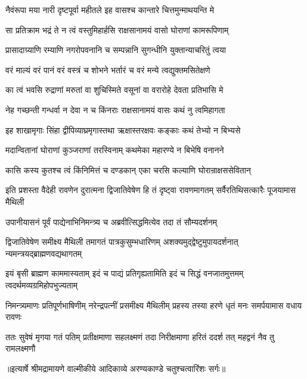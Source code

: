 \twolineshloka
{नैवंरूपा मया नारी दृष्टपूर्वा महीतले}
{इह वासश्च कान्तारे चित्तमुन्माथयन्ति मे} %

\twolineshloka
{सा प्रतिक्राम भद्रं ते न त्वं वस्तुमिहार्हसि}
{राक्षसानामयं वासो घोराणां कामरूपिणाम्} %

\twolineshloka
{प्रासादाग्र्याणि रम्याणि नगरोपवनानि च}
{सम्पन्नानि सुगन्धीनि युक्तान्याचरितुं त्वया} %

\twolineshloka
{वरं माल्यं वरं पानं वरं वस्त्रं च शोभने}
{भर्तारं च वरं मन्ये त्वद्युक्तमसितेक्षणे} %

\twolineshloka
{का त्वं भवसि रुद्राणां मरुतां वा शुचिस्मिते}
{वसूनां वा वरारोहे देवता प्रतिभासि मे} %

\twolineshloka
{नेह गच्छन्ती गन्धर्वा न देवा न च किंनराः}
{राक्षसानामयं वासः कथं नु त्वमिहागता} %

\twolineshloka
{इह शाखामृगाः सिंहा द्वीपिव्याघ्रमृगास्तथा}
{ऋक्षास्तरक्षवः कङ्काः कथं तेभ्यो न बिभ्यसे} %

\twolineshloka
{मदान्वितानां घोराणां कुञ्जराणां तरस्विनाम्}
{कथमेका महारण्ये न बिभेषि वनानने} %

\twolineshloka
{कासि कस्य कुतश्च त्वं किंनिमित्तं च दण्डकान्}
{एका चरसि कल्याणि घोरान्राक्षससेवितान्} %

\threelineshloka
{इति प्रशस्ता वैदेही रावणेन दुरात्मना}
{द्विजातिवेषेण हि तं दृष्ट्वा रावणमागतम्}
{सर्वैरतिथिसत्कारैः पूजयामास मैथिली} %

\twolineshloka
{उपानीयासनं पूर्वं पाद्येनाभिनिमन्त्र्य च}
{अब्रवीत्सिद्धमित्येव तदा तं सौम्यदर्शनम्} %

\fourlineindentedshloka
{द्विजातिवेषेण समीक्ष्य मैथिली}
{तमागतं पात्रकुसुम्भधारिणम्}
{अशक्यमुद्द्वेष्टुमुपायदर्शनात्}
{न्यमन्त्रयद्ब्राह्मणवद्यथागतम्} %

\fourlineindentedshloka
{इयं बृसी ब्राह्मण काममास्यताम्}
{इदं च पाद्यं प्रतिगृह्यतामिति}
{इदं च सिद्धं वनजातमुत्तमम्}
{त्वदर्थमव्यग्रमिहोपभुज्यताम्} %

\fourlineindentedshloka
{निमन्त्र्यमाणः प्रतिपूर्णभाषिणीम्}
{नरेन्द्रपत्नीं प्रसमीक्ष्य मैथिलीम्}
{प्रहस्य तस्या हरणे धृतं मनः}
{समर्पयामास वधाय रावणः} %

\fourlineindentedshloka
{ततः सुवेषं मृगया गतं पतिम्}
{प्रतीक्षमाणा सहलक्ष्मणं तदा}
{निरीक्षमाणा हरितं ददर्श तत्}
{महद्वनं नैव तु रामलक्ष्मणौ} %


{॥इत्यार्षे श्रीमद्रामायणे वाल्मीकीये आदिकाव्ये अरण्यकाण्डे चतुश्चत्वारिंशः सर्गः॥}

